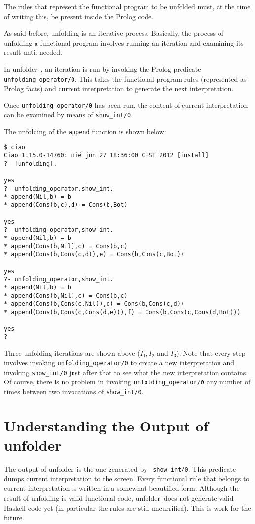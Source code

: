 \documentclass[11pt,a4paper,twoside,openright]{book}
\newcommand{\unfolder}{{\textsf{unfolder~}}}
\begin{document}
The rules that represent the functional program to be unfolded must,
at the time of writing this, be present inside the Prolog code.

As said before, unfolding is an iterative process. Basically, the
process of unfolding a functional program involves running an
iteration and examining its result until needed.

In \unfolder, an iteration is run by invoking the Prolog predicate \\
{\tt unfolding\_operator/0}. This takes the functional program
rules (represented as Prolog facts) and current interpretation to
generate the next interpretation.

Once {\tt unfolding\_operator/0} has been run, the content of current
interpretation can be examined by means of {\tt show\_int/0}.

The unfolding of the {\tt append} function is shown below:

\begin{verbatim}
$ ciao
Ciao 1.15.0-14760: mié jun 27 18:36:00 CEST 2012 [install]
?- [unfolding].

yes
?- unfolding_operator,show_int.
* append(Nil,b) = b
* append(Cons(b,c),d) = Cons(b,Bot)

yes
?- unfolding_operator,show_int.
* append(Nil,b) = b
* append(Cons(b,Nil),c) = Cons(b,c)
* append(Cons(b,Cons(c,d)),e) = Cons(b,Cons(c,Bot))

yes
?- unfolding_operator,show_int.
* append(Nil,b) = b
* append(Cons(b,Nil),c) = Cons(b,c)
* append(Cons(b,Cons(c,Nil)),d) = Cons(b,Cons(c,d))
* append(Cons(b,Cons(c,Cons(d,e))),f) = Cons(b,Cons(c,Cons(d,Bot)))

yes
?-
\end{verbatim}  

\noindent
Three unfolding iterations are shown above ($I_1, I_2$ and $I_3$). Note
that every step involves invoking {\tt unfolding\_operator/0} to
create a new interpretation and invoking {\tt show\_int/0} just after
that to see what the new interpretation contains. Of course, there is
no problem in invoking {\tt unfolding\_operator/0} any number of times
between two invocations of {\tt show\_int/0}.

\section{Understanding the Output of \unfolder}

The output of \unfolder is the one generated by {\tt
  show\_int/0}. This predicate dumps current interpretation to the
screen. Every functional rule that belongs to current interpretation
is written in a somewhat beautified form. Although the result of
unfolding is valid functional code, \unfolder does not generate valid
Haskell code yet (in particular the rules are still uncurrified). This
is work for the future.
\end{document}
